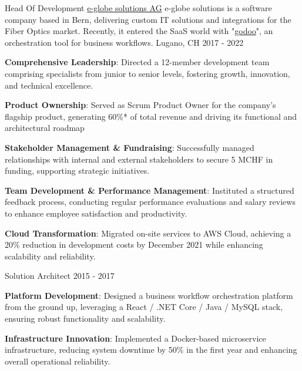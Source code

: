 \begin{cventries}
	\cventry
	{Head Of Development} %
	{\href{https://www.e-globe-solutions.com}{e-globe solutions AG}} %
  {e-globe solutions is a software company based in Bern, delivering custom IT solutions and integrations for the Fiber Optics market. Recently, it entered the SaaS world with "\href{https://www.godoo.ch}{godoo}", an orchestration tool for business workflows.} %
	{Lugano, CH} %
	{2017 - 2022} %
	{
		\begin{cvitems} %
			\item {\textbf{Comprehensive Leadership}: Directed a 12-member development team comprising specialists from junior to senior levels, fostering growth, innovation, and technical excellence.}
			\item {\textbf{Product Ownership}: Served as Scrum Product Owner for the company’s flagship product, generating 60\%* of total revenue and driving its functional and architectural roadmap}
			\item {\textbf{Stakeholder Management \& Fundraising}: Successfully managed relationships with internal and external stakeholders to secure 5 MCHF in funding, supporting strategic initiatives.}
			\item {\textbf{Team Development \& Performance Management}: Instituted a structured feedback process, conducting regular performance evaluations and salary reviews to enhance employee satisfaction and productivity.}
			\item {\textbf{Cloud Transformation}: Migrated on-site services to AWS Cloud, achieving a 20\% reduction in development costs by December 2021 while enhancing scalability and reliability.}
		\end{cvitems}
	}

  \cventry
    {Solution Architect} %
    {} %
    {} %
    {} %
    {2015 - 2017} %
    {
      \begin{cvitems} %
        \item {\textbf{Platform Development}: Designed a business workflow orchestration platform from the ground up, leveraging a React / .NET Core / Java / MySQL stack, ensuring robust functionality and scalability.}
        \item {\textbf{Infrastructure Innovation}: Implemented a Docker-based microservice infrastructure, reducing system downtime by 50\% in the first year and enhancing overall operational reliability.}
      \end{cvitems}
    }


\end{cventries}
